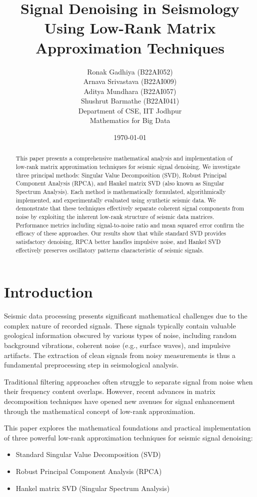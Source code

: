 \documentclass[10pt,twocolumn]{article}
\title{Signal Denoising in Seismology Using Low-Rank Matrix Approximation Techniques}
\author{Ronak Gadhiya (B22AI052) \\ 
        Arnava Srivastava (B22AI009) \\
        Aditya Mundhara (B22AI057) \\
        Shushrut Barmathe (B22AI041) \\
        Department of CSE, IIT Jodhpur \\
        Mathematics for Big Data}
\date{\today}
\begin{document}
\maketitle

\begin{abstract}
This paper presents a comprehensive mathematical analysis and implementation of low-rank matrix approximation techniques for seismic signal denoising. We investigate three principal methods: Singular Value Decomposition (SVD), Robust Principal Component Analysis (RPCA), and Hankel matrix SVD (also known as Singular Spectrum Analysis). Each method is mathematically formulated, algorithmically implemented, and experimentally evaluated using synthetic seismic data. We demonstrate that these techniques effectively separate coherent signal components from noise by exploiting the inherent low-rank structure of seismic data matrices. Performance metrics including signal-to-noise ratio and mean squared error confirm the efficacy of these approaches. Our results show that while standard SVD provides satisfactory denoising, RPCA better handles impulsive noise, and Hankel SVD effectively preserves oscillatory patterns characteristic of seismic signals.
\end{abstract}

\section{Introduction}
Seismic data processing presents significant mathematical challenges due to the complex nature of recorded signals. These signals typically contain valuable geological information obscured by various types of noise, including random background vibrations, coherent noise (e.g., surface waves), and impulsive artifacts. The extraction of clean signals from noisy measurements is thus a fundamental preprocessing step in seismological analysis.

Traditional filtering approaches often struggle to separate signal from noise when their frequency content overlaps. However, recent advances in matrix decomposition techniques have opened new avenues for signal enhancement through the mathematical concept of low-rank approximation.

This paper explores the mathematical foundations and practical implementation of three powerful low-rank approximation techniques for seismic signal denoising:

\begin{itemize}
\item Standard Singular Value Decomposition (SVD)
\item Robust Principal Component Analysis (RPCA)
\item Hankel matrix SVD (Singular Spectrum Analysis)
\end{itemize}
\end{document}
